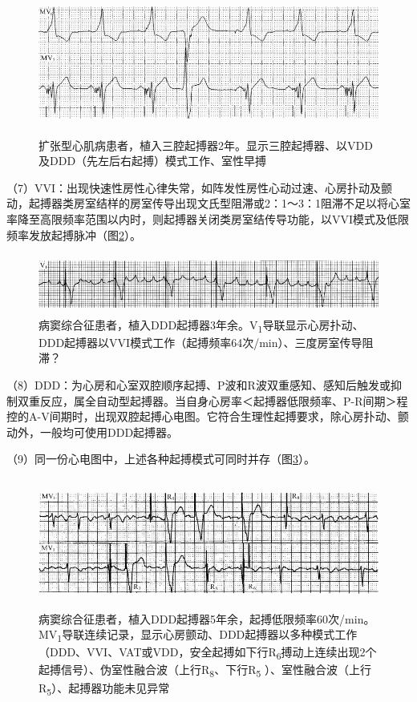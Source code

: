 \begin{figure}[!htbp]
 \centering
 \includegraphics[width=5.58333in,height=1.85417in]{./images/Image00627.jpg}
 \captionsetup{justification=centering}
 \caption{扩张型心肌病患者，植入三腔起搏器2年。显示三腔起搏器、以VDD及DDD（先左后右起搏）模式工作、室性早搏}
 \label{fig38-24}
  \end{figure} 

（7）VVI：出现快速性房性心律失常，如阵发性房性心动过速、心房扑动及颤动，起搏器类房室结样的房室传导出现文氏型阻滞或2：1～3：1阻滞不足以将心室率降至高限频率范围以内时，则起搏器关闭类房室结传导功能，以VVI模式及低限频率发放起搏脉冲（图\ref{fig38-25}）。

\begin{figure}[!htbp]
 \centering
 \includegraphics[width=5.58333in,height=0.77083in]{./images/Image00628.jpg}
 \captionsetup{justification=centering}
 \caption{病窦综合征患者，植入DDD起搏器3年余。V\textsubscript{1}导联显示心房扑动、DDD起搏器以VVI模式工作（起搏频率64次/min）、三度房室传导阻滞？}
 \label{fig38-25}
  \end{figure} 


（8）DDD：为心房和心室双腔顺序起搏、P波和R波双重感知、感知后触发或抑制双重反应，属全自动型起搏器。当自身心房率＜起搏器低限频率、P-R间期＞程控的A-V间期时，出现双腔起搏心电图。它符合生理性起搏要求，除心房扑动、颤动外，一般均可使用DDD起搏器。

（9）同一份心电图中，上述各种起搏模式可同时并存（图\ref{fig38-26}）。

\begin{figure}[!htbp]
 \centering
 \includegraphics[width=5.58333in,height=1.67708in]{./images/Image00629.jpg}
 \captionsetup{justification=centering}
 \caption{病窦综合征患者，植入DDD起搏器5年余，起搏低限频率60次/min。MV\textsubscript{1}导联连续记录，显示心房颤动、DDD起搏器以多种模式工作（DDD、VVI、VAT或VDD，安全起搏如下行R\textsubscript{6}搏动上连续出现2个起搏信号）、伪室性融合波（上行R\textsubscript{8}、下行R\textsubscript{5} ）、室性融合波（上行R\textsubscript{5}）、起搏器功能未见异常}
 \label{fig38-26}
  \end{figure} 


